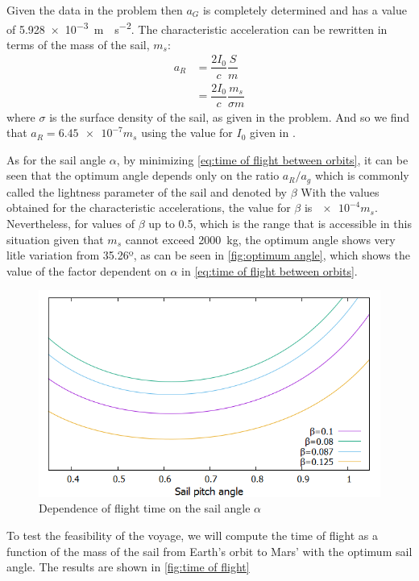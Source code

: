 \documentclass[twocolumn,12pt,a4paper]{article}
\numberwithin{equation}{section}
\begin{document}
Given the data in the problem then \( a_G \) is completely determined and has a value of \SI{5,928e-3}{m \cdot s^{-2}}. The characteristic acceleration can be rewritten in terms of the mass of the sail, \( m_s \):
\begin{align*}
  a_R &= \dfrac{2I_0}{c} \dfrac{S}{m} \\
  		&= \dfrac{2I_0}{c} \dfrac{m_s}{\sigma m}
\end{align*}
where \( \sigma \) is the surface density of the sail, as given in the problem. And so we find that \( a_R = \num{6,45e-7} m_s \) using the value for \( I_0 \) given in \cite{hollerman}.

As for the sail angle \( \alpha \), by minimizing \autoref{eq:time of flight between orbits}, it can be seen that the optimum angle depends only on the ratio \( a_R / a_g \) which is commonly called the lightness parameter of the sail and denoted by \( \beta \) With the values obtained for the characteristic accelerations, the value for \( \beta \) is \( \num{e-4} m_s \). Nevertheless, for values of \( \beta \) up to 0.5, which is the range that is accessible in this situation given that \( m_s \) cannot exceed \SI{2000}{kg}, the optimum angle shows very litle variation from 35.26º, as can be seen in \autoref{fig:optimum angle}, which shows the value of the factor dependent on \( \alpha \) in \autoref{eq:time of flight between orbits}.

\begin{figure} 
	\centering
	\includegraphics[scale=0.3]{angle.png}
	\caption{Dependence of flight time on the sail angle $\alpha$}
	\label{fig:optimum angle}
\end{figure}

To test the feasibility of the voyage, we will compute the time of flight as a function of the mass of the sail from Earth's orbit to Mars' with the optimum sail angle. The results are shown in \autoref{fig:time of flight}
\end{document}
